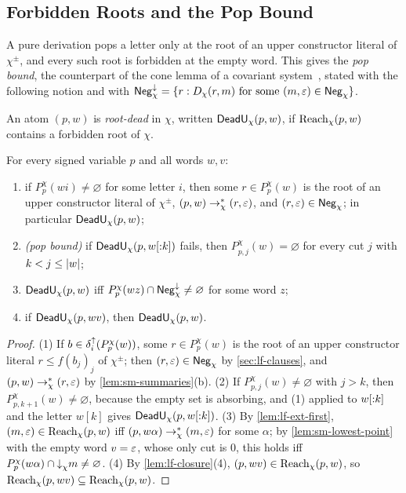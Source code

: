 \subsection{Forbidden Roots and the Pop Bound}\label{sec:sm-cone}

A pure derivation pops a letter only at the root of an upper constructor
literal of $\chi^\pm$, and every such root is forbidden at the empty word. This
gives the \emph{pop bound}, the counterpart of the cone lemma of a covariant
system~\citep{Zhao26}, stated with the following notion and with
$\mathsf{Neg}^{\downarrow}_{\chi}=\{r:D_\chi(r,m)\text{ for some }(m,\varepsilon)\in\mathsf{Neg}_\chi\}$.

\begin{definition}\label{def:sm-deadu}
An atom $(p,w)$ is \emph{root-dead} in $\chi$, written $\mathsf{DeadU}_\chi(p,w)$, if
$\operatorname{Reach}_\chi(p,w)$ contains a forbidden root of $\chi$.
\end{definition}

\begin{lemma}\label{lem:sm-roots}
For every signed variable $p$ and all words $w,v$:
\begin{enumerate}[leftmargin=*]
\item if $P^\chi_p(wi)\ne\varnothing$ for some letter $i$, then some
  $r\in P^\chi_p(w)$ is the root of an upper constructor literal of
  $\chi^\pm$, $(p,w)\to^*_\chi(r,\varepsilon)$, and $(r,\varepsilon)\in\mathsf{Neg}_\chi$; in
  particular $\mathsf{DeadU}_\chi(p,w)$;
\item \emph{(pop bound)} if $\mathsf{DeadU}_\chi(p,w[{:}k])$ fails, then
  $P^\chi_{p,j}(w)=\varnothing$ for every cut $j$ with $k<j\le\lvert w\rvert$;
\item $\mathsf{DeadU}_\chi(p,w)$ iff $P^\chi_p(wz)\cap\mathsf{Neg}^{\downarrow}_{\chi}\ne\varnothing$ for
  some word $z$;
\item if $\mathsf{DeadU}_\chi(p,wv)$, then $\mathsf{DeadU}_\chi(p,w)$.
\end{enumerate}
\end{lemma}

\begin{proof}
(1) If $b\in\delta^{\uparrow}_{i}(P^\chi_p(w))$, some $r\in P^\chi_p(w)$ is the root of an
upper constructor literal $r\le f(b_j)_j$ of $\chi^\pm$; then
$(r,\varepsilon)\in\mathsf{Neg}_\chi$ by \cref{sec:lf-clauses}, and
$(p,w)\to^*_\chi(r,\varepsilon)$ by \cref{lem:sm-summaries}(b).
(2) If $P^\chi_{p,j}(w)\ne\varnothing$ with $j>k$, then
$P^\chi_{p,k+1}(w)\ne\varnothing$, because the empty set is absorbing, and (1)
applied to $w[{:}k]$ and the letter $w[k]$ gives $\mathsf{DeadU}_\chi(p,w[{:}k])$.
(3) By \cref{lem:lf-ext-first}, $(m,\varepsilon)\in \operatorname{Reach}_\chi(p,w)$ iff
$(p,w\alpha)\to^*_\chi(m,\varepsilon)$ for some $\alpha$; by
\cref{lem:sm-lowest-point} with the empty word $v=\varepsilon$, whose only cut is $0$,
this holds iff $P^\chi_p(w\alpha)\cap\mathord{\downarrow}_{\chi} m\ne\varnothing$. (4) By
\cref{lem:lf-closure}(4), $(p,wv)\in \operatorname{Reach}_\chi(p,w)$, so
$\operatorname{Reach}_\chi(p,wv)\subseteq \operatorname{Reach}_\chi(p,w)$.
\end{proof}

